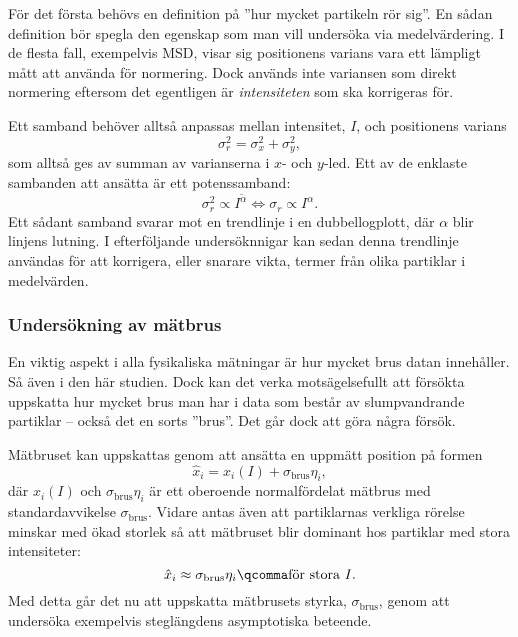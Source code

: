 För det första behövs en definition på ''hur mycket partikeln rör sig''. En sådan definition bör spegla den egenskap som man vill undersöka via medelvärdering. I de flesta fall, exempelvis MSD, visar sig positionens varians vara ett lämpligt mått att använda för normering. Dock används inte variansen som direkt normering eftersom det egentligen är \emph{intensiteten} som ska korrigeras för.

Ett samband behöver alltså anpassas mellan intensitet, $I$, och positionens varians
\begin{equation}
\sigma_r^2=\sigma_x^2+\sigma_y^2,
\end{equation}
som alltså ges av summan av varianserna i $x$- och $y$-led.
Ett av de enklaste sambanden att ansätta är ett potenssamband:
\begin{equation}
\sigma_r^2 \propto I^{\tilde\alpha} 
\Longleftrightarrow 
\sigma_r \propto I^\alpha.
\end{equation}
Ett sådant samband svarar mot en trendlinje i en dubbellogplott, där $\alpha$ blir linjens lutning. I efterföljande undersöknnigar kan sedan denna trendlinje användas för att korrigera, eller snarare vikta, termer från olika partiklar i medelvärden.

\subsubsection{Undersökning av mätbrus}
En viktig aspekt i alla fysikaliska mätningar är hur mycket brus datan innehåller. Så även i den här studien. Dock kan det verka motsägelsefullt att försökta uppskatta hur mycket brus man har i data som består av slumpvandrande partiklar -- också det en sorts ''brus''. Det går dock att göra några försök. 

Mätbruset kan uppskattas genom att ansätta en uppmätt position på formen
\begin{equation}
\hat{x}_i = x_i(I) + \sigma_\text{brus}\eta_i,
\end{equation}
där $x_i(I)$ och $\sigma_\text{brus}\eta_i$ är ett oberoende normalfördelat mätbrus med standardavvikelse $\sigma_\text{brus}$. Vidare antas även att partiklarnas verkliga rörelse minskar med ökad storlek så att mätbruset blir dominant hos partiklar med stora intensiteter:
\begin{equation}\label{eq:approx_noise}
\hat{x}_i \approx \sigma_\text{brus}\eta_i \qcomma \text{för stora } I.
\end{equation}
Med detta går det nu att uppskatta mätbrusets styrka, $\sigma_\text{brus}$, genom att undersöka exempelvis steglängdens asymptotiska beteende. 

